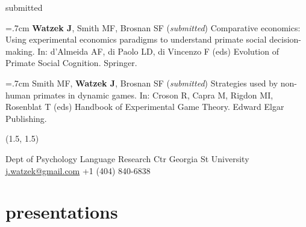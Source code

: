 \documentclass[]{friggeri-cv}
\begin{document}
{\large{} submitted}

\hangindent=.7cm \textbf{Watzek J}, Smith MF, Brosnan SF (\emph{submitted}) Comparative economics: Using experimental economics paradigms to understand primate social decision-making. In: d'Almeida AF, di Paolo LD, di Vincenzo F (eds) Evolution of Primate Social Cognition. Springer.

\hangindent=.7cm Smith MF, \textbf{Watzek J}, Brosnan SF (\emph{submitted}) Strategies used by non-human primates in dynamic games. In: Croson R, Capra M, Rigdon MI, Rosenblat T (eds) Handbook of Experimental Game Theory. Edward Elgar Publishing. \\[-.1cm]


\renewenvironment{aside}{%
  \let\oldsection\section
  \renewcommand{\section}[1]{
    \par\vspace{\baselineskip}{\Large\headingfont\color{headercolor} ##1}
  }
  \begin{textblock}{3.6}(1.5, 1.5)
  \begin{flushright}
  \obeycr
}{%
  \restorecr
  \end{flushright}
  \end{textblock}
  \let\section\oldsection
}


\begin{aside}
  \section{{\normalfont julia}watzek}
    Dept of Psychology
    Language Research Ctr
    Georgia St University
    ~
    \href{mailto:j.watzek@gmail.com}{j.watzek@gmail.com}
    +1 (404) 840-6838
\end{aside}


\section{presentations} ~\\[-1.3cm]
\end{document}
